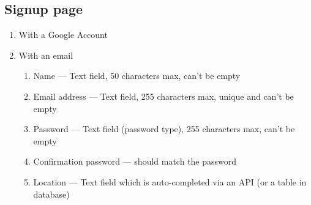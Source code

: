 \documentclass[conference]{IEEEtran}
\begin{document}
\subsection{Signup page}

\begin{enumerate}
    \item With a Google Account
    \item With an email
    \begin{enumerate}
        \item Name --- Text field, 50 characters max, can’t be empty
        \item Email address --- Text field, 255 characters max, unique and can’t be empty
        \item Password --- Text field (password type), 255 characters max, can’t be empty
        \item Confirmation password --- should match the password
        \item Location --- Text field which is auto-completed via an API (or a table in database)
    \end{enumerate}
\end{enumerate}
\end{document}
